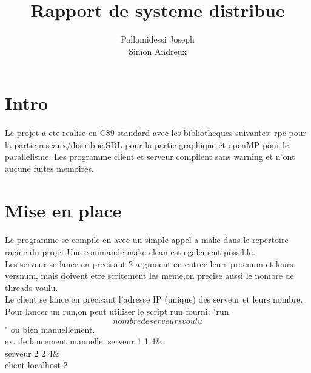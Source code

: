 \documentclass{article}
\begin{document}
\title{Rapport de systeme distribue}
\author{Pallamidessi Joseph \\
        Simon Andreux
        }
\maketitle

\section{Intro} %
\label{sec:Intro}
  \paragraph{} %
  \label{par:}
    Le projet a ete realise en C89 standard avec les bibliotheques suivantes: rpc pour la partie
    reseaux/distribue,SDL pour la partie graphique et openMP pour le parallelisme. Les
    programme client et serveur compilent sans warning et n'ont aucune fuites memoires.

\section{Mise en place} %

\label{sec:Mise en place}
  \paragraph{} %
  \label{par:}
    Le programme se compile en avec un simple appel a make dans le repertoire racine du
    projet.Une commande make clean est egalement possible.\\
    Les serveur se lance en precisant 2 argument en entree leurs procnum et leurs versnum, 
    mais doivent etre scritement les meme,on precise aussi le nombre de threads voulu.\\
    Le client se lance en precisant l'adresse IP (unique) des serveur et leurs nombre. \\
    Pour lancer un run,on peut utiliser le script run fourni: "run \[nombre de serveurs voulu\]" ou
    bien manuellement.\\
    ex. de lancement manuelle: serveur 1 1 4& \\
                               serveur 2 2 4& \\
                               client localhost 2\\
\end{document}
